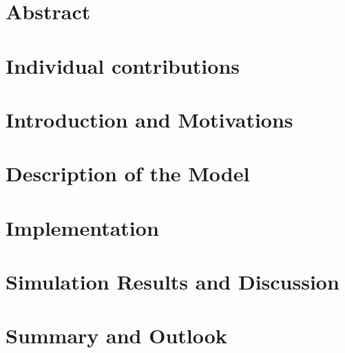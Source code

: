 \documentclass[11pt]{article}
\begin{document}
\section{Abstract}


\section{Individual contributions}


\section{Introduction and Motivations} \label{intro}


\section{Description of the Model} \label{modeldesc}


\section{Implementation}


\section{Simulation Results and Discussion}

\section{Summary and Outlook}

\begin{flushleft}
\nocite{*}


\end{flushleft}
\end{document}

